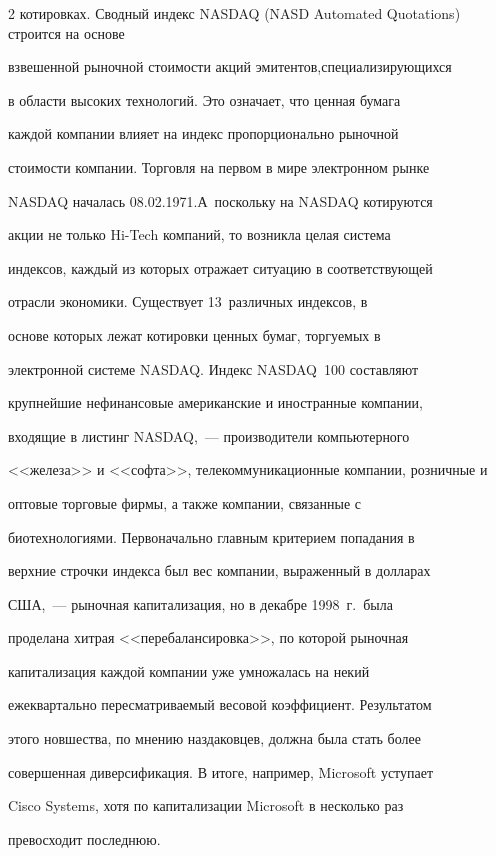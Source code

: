 \begin{multicols}{2}
котировках. Сводный индекс NASDAQ (NASD Automated Quotations) строится на основе


взвешенной рыночной стоимости акций эмитентов,\linebreak специализирующихся


в области высоких технологий. Это означает, что ценная бумага


каждой компании влияет на индекс пропорционально рыночной


стоимости компании. Тор\-гов\-ля на первом в мире электронном рынке


NASDAQ началась 08.02.1971.\linebreak А~поскольку на NASDAQ котируются


акции не только Hi-Tech компаний, то возникла целая сис\-те\-ма


индексов, каждый из которых отражает ситуацию в соответствующей


отрасли экономики. Существует 13~различных индексов, в


основе которых лежат котировки ценных бумаг, торгуемых в


электронной системе NASDAQ. Индекс NASDAQ~100 составляют


крупнейшие нефинансовые американские и иностранные компании,


входящие в листинг NASDAQ,~--- производители компьютерного


<<железа>> и <<софта>>, телекоммуникационные компании, розничные и


оптовые торговые фирмы, а также компании, связанные с


биотехнологиями. Первоначально главным критерием попадания в


верхние строчки индекса был вес компании, выраженный в долларах


США,~--- рыночная капитализация, но в декабре 1998~г.\ была


проделана хитрая <<перебалансировка>>, по которой рыночная


капитализация каждой компании уже умножалась на некий


ежеквартально пересматриваемый весовой коэффициент. Результатом


этого новшества, по мнению наздаковцев, должна была стать более


совершенная диверсификация. В итоге, например, Microsoft уступает


Cisco Systems, хотя по капитализации Microsoft в несколько раз


превосходит последнюю.






\end{multicols}
